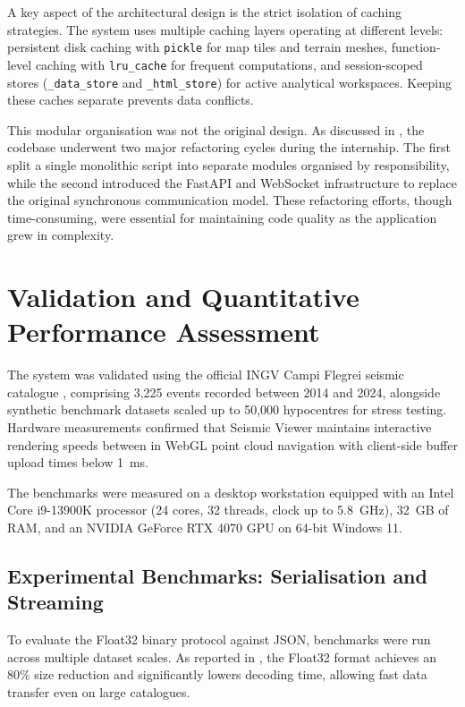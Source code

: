 A key aspect of the architectural design is the strict isolation of caching strategies. The system uses multiple caching layers operating at different levels: persistent disk caching with \texttt{pickle} for map tiles and terrain meshes, function-level caching with \texttt{lru\_cache} for frequent computations, and session-scoped stores (\texttt{\_data\_store} and \texttt{\_html\_store}) for active analytical workspaces. Keeping these caches separate prevents data conflicts.

This modular organisation was not the original design. As discussed in , the codebase underwent two major refactoring cycles during the internship. The first split a single monolithic script into separate modules organised by responsibility, while the second introduced the FastAPI and WebSocket infrastructure to replace the original synchronous communication model. These refactoring efforts, though time-consuming, were essential for maintaining code quality as the application grew in complexity.

\section{Validation and Quantitative Performance Assessment}
\label{sec:validation}

The system was validated using the official INGV Campi Flegrei seismic catalogue \cite{ingv}, comprising 3,225 events recorded between 2014 and 2024, alongside synthetic benchmark datasets scaled up to 50,000 hypocentres for stress testing. Hardware measurements confirmed that Seismic Viewer maintains interactive rendering speeds between  in WebGL point cloud navigation with client-side buffer upload times below 1~ms.

 The benchmarks were measured on a desktop workstation equipped with an Intel Core i9-13900K processor (24 cores, 32 threads, clock up to 5.8~GHz), 32~GB of RAM, and an NVIDIA GeForce RTX 4070 GPU on 64-bit Windows 11.

\subsection{Experimental Benchmarks: Serialisation and Streaming}

To evaluate the Float32 binary protocol against JSON, benchmarks were run across multiple dataset scales. As reported in , the Float32 format achieves an 80\% size reduction and significantly lowers decoding time, allowing fast data transfer even on large catalogues.


